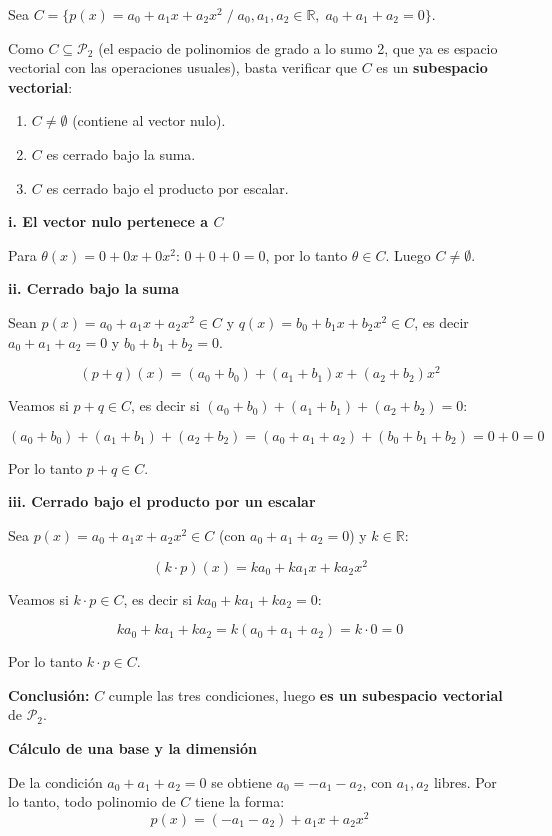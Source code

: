 \documentclass[12pt]{article}
\begin{document}
\begin{enumerate}[label=\alph*.-]
    Sea $C = \{p(x)=a_0+a_1x+a_2x^2 \; / \; a_0,a_1,a_2\in\mathbb{R},\; a_0+a_1+a_2=0\}$.

    Como $C \subseteq \mathcal{P}_2$ (el espacio de polinomios de grado a lo sumo 2, que ya es espacio vectorial con las operaciones usuales), basta verificar que $C$ es un \textbf{subespacio vectorial}:

    \begin{enumerate}
        \item[i.] $C \neq \emptyset$ (contiene al vector nulo).
        \item[ii.] $C$ es cerrado bajo la suma.
        \item[iii.] $C$ es cerrado bajo el producto por escalar.
    \end{enumerate}

    \textbf{i. El vector nulo pertenece a $C$}

    Para $\theta(x)=0+0x+0x^2$: $0+0+0=0$, por lo tanto $\theta \in C$. Luego $C \neq \emptyset$.

    \textbf{ii. Cerrado bajo la suma}

    Sean $p(x)=a_0+a_1x+a_2x^2 \in C$ y $q(x)=b_0+b_1x+b_2x^2 \in C$, es decir $a_0+a_1+a_2=0$ y $b_0+b_1+b_2=0$.

    \[
    (p+q)(x) = (a_0+b_0)+(a_1+b_1)x+(a_2+b_2)x^2
    \]

    Veamos si $p+q \in C$, es decir si $(a_0+b_0)+(a_1+b_1)+(a_2+b_2)=0$:

    \[
    (a_0+b_0)+(a_1+b_1)+(a_2+b_2) = (a_0+a_1+a_2)+(b_0+b_1+b_2) = 0+0=0
    \]

    Por lo tanto $p+q \in C$.

    \textbf{iii. Cerrado bajo el producto por un escalar}

    Sea $p(x)=a_0+a_1x+a_2x^2\in C$ (con $a_0+a_1+a_2=0$) y $k \in \mathbb{R}$:

    \[
    (k\cdot p)(x) = ka_0+ka_1x+ka_2x^2
    \]

    Veamos si $k\cdot p \in C$, es decir si $ka_0+ka_1+ka_2=0$:

    \[
    ka_0+ka_1+ka_2 = k(a_0+a_1+a_2) = k\cdot 0=0
    \]

    Por lo tanto $k\cdot p \in C$.

    \textbf{Conclusión:} $C$ cumple las tres condiciones, luego \textbf{es un subespacio vectorial} de $\mathcal{P}_2$.

    \textbf{Cálculo de una base y la dimensión}

    De la condición $a_0+a_1+a_2=0$ se obtiene $a_0=-a_1-a_2$, con $a_1,a_2$ libres. Por lo tanto, todo polinomio de $C$ tiene la forma:
    \[
    p(x) = (-a_1-a_2)+a_1x+a_2x^2
    \]


\end{enumerate}
\end{document}
